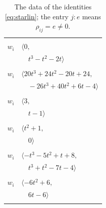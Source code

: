 \documentclass[11pt]{article}
\begin{document}
\begingroup\scriptsize
\setlength{\LTcapwidth}{\textwidth}
\begin{longtable}{@{}ll@{}}
\caption{The data of the identities \eqref{eq:starlin}; the entry $j{:}e$ means $\rho_{ij}=e\neq0$.}\label{tab:star}\\
\hline\endfirsthead\hline\endhead\hline\endfoot
\multicolumn{2}{@{}p{0.97\textwidth}@{}}{$i=0$, $D_i=1$, $\rho_{ij}$: $4{:}1, \allowbreak 18{:}2, \allowbreak 20{:}1, \allowbreak 34{:}3, \allowbreak 39{:}3$}\\
$w_i$ & $\langle 0,$\\
 & $\quad t^{3}-t^{2}-2t\rangle$\\
\addlinespace[2pt]
\multicolumn{2}{@{}p{0.97\textwidth}@{}}{$i=1$, $D_i=1$, $\rho_{ij}$: $5{:}1, \allowbreak 9{:}2, \allowbreak 10{:}2, \allowbreak 11{:}3, \allowbreak 12{:}2, \allowbreak 17{:}3, \allowbreak 19{:}3, \allowbreak 24{:}3, \allowbreak 26{:}2, \allowbreak 42{:}2, \allowbreak 46{:}3$}\\
$w_i$ & $\langle 20t^{3}+24t^{2}-20t+24,$\\
 & $\quad -26t^{3}+40t^{2}+6t-4\rangle$\\
\addlinespace[2pt]
\multicolumn{2}{@{}p{0.97\textwidth}@{}}{$i=2$, $D_i=1$, $\rho_{ij}$: $5{:}2, \allowbreak 18{:}2, \allowbreak 19{:}2, \allowbreak 36{:}2, \allowbreak 40{:}2$}\\
$w_i$ & $\langle 3,$\\
 & $\quad t-1\rangle$\\
\addlinespace[2pt]
\multicolumn{2}{@{}p{0.97\textwidth}@{}}{$i=3$, $D_i=1$, $\rho_{ij}$: $16{:}2, \allowbreak 19{:}2, \allowbreak 32{:}1$}\\
$w_i$ & $\langle t^{2}+1,$\\
 & $\quad 0\rangle$\\
\addlinespace[2pt]
\multicolumn{2}{@{}p{0.97\textwidth}@{}}{$i=4$, $D_i=1$, $\rho_{ij}$: $0{:}3, \allowbreak 24{:}1, \allowbreak 26{:}3, \allowbreak 33{:}3, \allowbreak 34{:}1, \allowbreak 44{:}2$}\\
$w_i$ & $\langle -t^{3}-5t^{2}+t+8,$\\
 & $\quad t^{3}+t^{2}-7t-4\rangle$\\
\addlinespace[2pt]
\multicolumn{2}{@{}p{0.97\textwidth}@{}}{$i=5$, $D_i=1$, $\rho_{ij}$: $1{:}3, \allowbreak 2{:}2, \allowbreak 14{:}1, \allowbreak 30{:}3$}\\
$w_i$ & $\langle -6t^{2}+6,$\\
 & $\quad 6t-6\rangle$\\
\addlinespace[2pt]
\multicolumn{2}{@{}p{0.97\textwidth}@{}}{$i=6$, $D_i=1$, $e_i=3$, $\rho_{ij}$: $10{:}2, \allowbreak 12{:}2, \allowbreak 16{:}1, \allowbreak 17{:}3, \allowbreak 24{:}2, \allowbreak 32{:}2, \allowbreak 35{:}3, \allowbreak 40{:}1, \allowbreak 43{:}3, \allowbreak 45{:}2, \allowbreak 46{:}2$}\\

\end{longtable}
\end{document}
